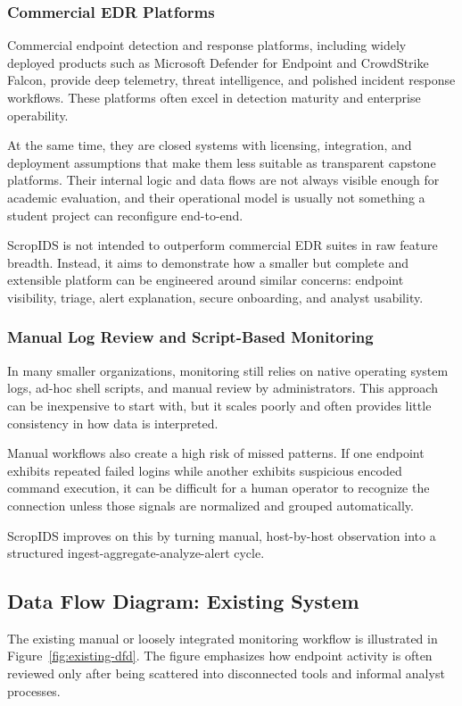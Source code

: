 \documentclass[12pt,a4paper]{article}
\begin{document}
\subsubsection{Commercial EDR Platforms}
Commercial endpoint detection and response platforms, including widely deployed products such as Microsoft Defender for Endpoint and CrowdStrike Falcon, provide deep telemetry, threat intelligence, and polished incident response workflows. These platforms often excel in detection maturity and enterprise operability.

At the same time, they are closed systems with licensing, integration, and deployment assumptions that make them less suitable as transparent capstone platforms. Their internal logic and data flows are not always visible enough for academic evaluation, and their operational model is usually not something a student project can reconfigure end-to-end.

ScropIDS is not intended to outperform commercial EDR suites in raw feature breadth. Instead, it aims to demonstrate how a smaller but complete and extensible platform can be engineered around similar concerns: endpoint visibility, triage, alert explanation, secure onboarding, and analyst usability.

\subsubsection{Manual Log Review and Script-Based Monitoring}
In many smaller organizations, monitoring still relies on native operating system logs, ad-hoc shell scripts, and manual review by administrators. This approach can be inexpensive to start with, but it scales poorly and often provides little consistency in how data is interpreted.

Manual workflows also create a high risk of missed patterns. If one endpoint exhibits repeated failed logins while another exhibits suspicious encoded command execution, it can be difficult for a human operator to recognize the connection unless those signals are normalized and grouped automatically.

ScropIDS improves on this by turning manual, host-by-host observation into a structured ingest-aggregate-analyze-alert cycle.

\subsection{Data Flow Diagram: Existing System}
The existing manual or loosely integrated monitoring workflow is illustrated in Figure~\ref{fig:existing-dfd}. The figure emphasizes how endpoint activity is often reviewed only after being scattered into disconnected tools and informal analyst processes.
\end{document}
